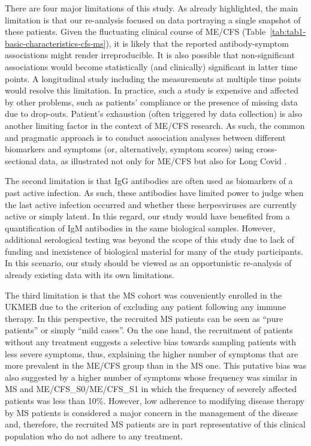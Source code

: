 There are four major limitations of this study. As already highlighted, the main limitation is that our re-analysis focused on data portraying a single snapshot of these patients. Given the fluctuating clinical course of ME/CFS (Table~\ref{tab:tab1-basic-characteristics-cfs-ms}), it is likely that the reported antibody-symptom associations might render irreproducible. It is also possible that non-significant associations would become statistically (and clinically) significant in latter time points. A longitudinal study including the measurements at multiple time points would resolve this limitation. In practice, such a study is expensive and affected by other problems, such as patients' compliance or the presence of missing data due to drop-outs. Patient's exhaustion (often triggered by data collection) is also another limiting factor in the context of ME/CFS research. As such, the common and pragmatic approach is to conduct association analyses between different biomarkers and symptoms (or, alternatively, symptom scores) using cross-sectional data, as illustrated not only for ME/CFS but also for Long Covid \citep{freitag2021AutoantibodiesVasoregulative, blauensteiner2021AlteredEndothelial, szklarski2021DelineatingAssociationa, sotzny2022DysregulatedAutoantibodies}.

The second limitation is that IgG antibodies are often used as biomarkers of a past active infection. As such, these antibodies have limited power to judge when the last active infection occurred and whether these herpesviruses are currently active or simply latent. In this regard, our study would have benefited from a quantification of IgM antibodies in the same biological samples. However, additional serological testing was beyond the scope of this study due to lack of funding and inexistence of biological material for many of the study participants. In this scenario, our study should be viewed as an opportunistic re-analysis of already existing data with its own limitations.

The third limitation is that the MS cohort was conveniently enrolled in the UKMEB due to the criterion of excluding any patient following any immune therapy. In this perspective, the recruited MS patients can be seen as ``pure patients'' or simply ``mild cases''. On the one hand, the recruitment of patients without any treatment suggests a selective bias towards sampling patients with less severe symptoms, thus, explaining the higher number of symptoms that are more prevalent in the ME/CFS group than in the MS one. This putative bias was also suggested by a higher number of symptoms whose frequency was similar in MS and ME/CFS\_S0/ME/CFS\_S1 in which the frequency of severely affected patients was less than 10\%. However, low adherence to modifying disease therapy by MS patients is considered a major concern in the management of the disease \citep{cerghet2010AdherenceDiseaseModifying, rieckmann2015AchievingPatient} and, therefore, the recruited MS patients are in part representative of this clinical population who do not adhere to any treatment.

